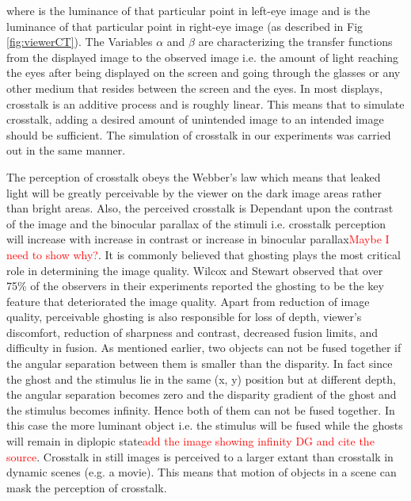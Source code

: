 where  is the luminance of that particular point in left-eye image and  is the luminance of that particular point in right-eye image (as described in Fig \ref{fig:viewerCT}). The Variables \(\alpha\) and \(\beta\) are characterizing the transfer functions from the displayed image to the observed image i.e. the amount of light reaching the eyes after being displayed on the screen and going through the glasses or any other medium that resides between the screen and the eyes. In most displays, crosstalk is an additive process and is roughly linear. This means that to simulate crosstalk, adding a desired amount of unintended image to an intended image should be sufficient. The simulation of crosstalk in our experiments was carried out in the same manner.

The perception of crosstalk obeys the Webber's law which means that leaked light will be greatly perceivable by the viewer on the dark image areas rather than bright areas. Also, the perceived crosstalk is Dependant upon the contrast of the image and the binocular parallax of the stimuli i.e. crosstalk perception will increase with increase in contrast or increase in binocular parallax\textcolor{red}{Maybe I need to show why?}. It is commonly believed that ghosting plays the most critical role in determining the image quality. Wilcox and Stewart \cite{wilcox2003determinants} observed that over 75\% of the observers in their experiments reported the ghosting to be the key feature that deteriorated the image quality. Apart from reduction of image quality, perceivable ghosting is also responsible for loss of depth, viewer's discomfort, reduction of sharpness and contrast, decreased fusion limits, and difficulty in fusion. As mentioned earlier, two objects can not be fused together if the angular separation between them is smaller than the disparity\cite{burt1980disparity}. In fact since the ghost and the stimulus lie in the same (x, y) position but at different depth, the angular separation becomes zero and the disparity gradient of the ghost and the stimulus becomes infinity. Hence both of them can not be fused together. In this case the more luminant object i.e. the stimulus will be fused while the ghosts will remain in diplopic state\textcolor{red}{add the image showing infinity DG and cite the source}. Crosstalk in still images is perceived to a larger extant than crosstalk in dynamic scenes (e.g. a movie). This means that motion of objects in a scene can mask the perception of crosstalk.

